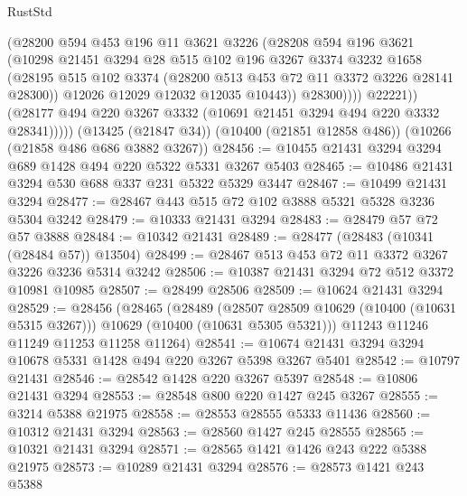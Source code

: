 \begin{lexlean}{RustStd}
\begin{coremodule}
{\begin{coremodule}
{{{{{{{{{{{{{{{{{{{{{{{{{                    (@28200
                      @594
                      @453
                      @196
                      @11
                      @3621
                      @3226
                      (@28208
                        @594
                        @196
                        @3621
                        (@10298
                          @21451
                          @3294
                          @28
                          @515
                          @102
                          @196
                          @3267
                          @3374
                          @3232
                          @1658
                          (@28195
                            @515
                            @102
                            @3374
                            (@28200 @513 @453 @72 @11 @3372 @3226 @28141 @28300))
                          @12026
                          @12029
                          @12032
                          @12035
                          @10443))
                      @28300))))
              @22221))
          (@28177 @494 @220 @3267 @3332 (@10691 @21451 @3294 @494 @220 @3332 @28341)))))
    (@13425 (@21847 @34))
    (@10400 (@21851 @12858 @486))
    (@10266 (@21858 @486 @686 @3882 @3267))
@28456 := @10455 @21431 @3294 @3294 @689 @1428 @494 @220 @5322 @5331 @3267 @5403
@28465 := @10486 @21431 @3294 @530 @688 @337 @231 @5322 @5329 @3447
@28467 := @10499 @21431 @3294
@28477 := @28467 @443 @515 @72 @102 @3888 @5321 @5328 @3236 @5304 @3242
@28479 := @10333 @21431 @3294
@28483 := @28479 @57 @72 @57 @3888
@28484 := @10342 @21431
@28489 := @28477 (@28483 (@10341 (@28484 @57)) @13504)
@28499 := @28467 @513 @453 @72 @11 @3372 @3267 @3226 @3236 @5314 @3242
@28506 := @10387 @21431 @3294 @72 @512 @3372 @10981 @10985
@28507 := @28499 @28506
@28509 := @10624 @21431 @3294
@28529 := @28456
    (@28465
      (@28489
        (@28507 @28509 @10629 (@10400 (@10631 @5315 @3267)))
        @10629
        (@10400 (@10631 @5305 @5321)))
      @11243
      @11246
      @11249
      @11253
      @11258
      @11264)
@28541 := @10674 @21431 @3294 @3294 @10678 @5331 @1428 @494 @220 @3267 @5398 @3267 @5401
@28542 := @10797 @21431
@28546 := @28542 @1428 @220 @3267 @5397
@28548 := @10806 @21431 @3294
@28553 := @28548 @800 @220 @1427 @245 @3267
@28555 := @3214 @5388 @21975
@28558 := @28553 @28555 @5333 @11436
@28560 := @10312 @21431 @3294
@28563 := @28560 @1427 @245 @28555
@28565 := @10321 @21431 @3294
@28571 := @28565 @1421 @1426 @243 @222 @5388 @21975
@28573 := @10289 @21431 @3294
@28576 := @28573 @1421 @243 @5388
}}}}}}}}}}}}}}}}}}}}}}}}}
\end{coremodule}}
\end{coremodule}
\end{lexlean}

